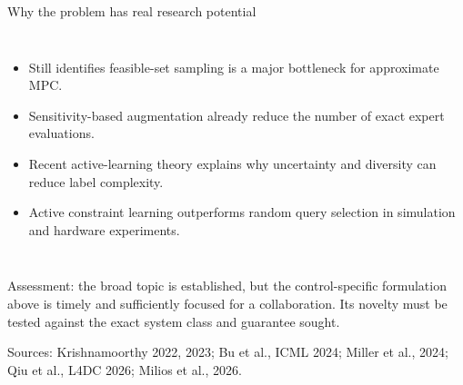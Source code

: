 \documentclass[aspectratio=169,10pt]{beamer}
\newcommand{\smallsource}[1]{\vfill\begin{flushleft}\color{Slate}\tiny #1\end{flushleft}}
\begin{document}
\begin{frame}{Why the problem has real research potential}
\begin{columns}[T,onlytextwidth]
\small
\begin{itemize}
  \setlength{\itemsep}{0.12em}
  \item Still identifies feasible-set sampling is a major bottleneck for approximate MPC.
  \item Sensitivity-based augmentation already reduce the number of exact expert evaluations.
  \item Recent active-learning theory explains why uncertainty and diversity can reduce label complexity.
  \item Active constraint learning outperforms random query selection in simulation and hardware experiments.
\end{itemize}

\end{columns}

\vspace{0.15cm}
\color{Slate}\scriptsize Assessment: the broad topic is established, but the control-specific formulation above is timely and sufficiently focused for a collaboration. Its novelty must be tested against the exact system class and guarantee sought.

\smallsource{Sources: Krishnamoorthy 2022, 2023; Bu et al., ICML 2024; Miller et al., 2024; Qiu et al., L4DC 2026; Milios et al., 2026.}
\end{frame}
\end{document}
